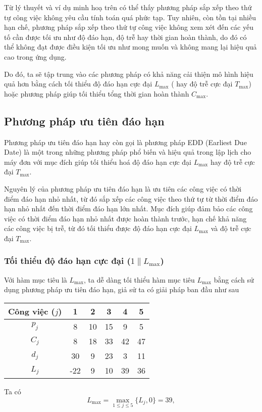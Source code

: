 \documentclass[12pt,a4paper]{report}
\begin{document}
Từ lý thuyết và ví dụ minh hoạ trên có thể thấy phương pháp sắp xếp theo thứ tự công việc không yêu cầu tính toán quá phức tạp. Tuy nhiên, còn tồn tại nhiều hạn chế, phương pháp sắp xếp theo thứ tự công việc không xem xét đến các yếu tố cần được tối ưu như độ đáo hạn, độ trễ hay thời gian hoàn thành, do đó có thể không đạt được điều kiện tối ưu như mong muốn và không mang lại hiệu quả cao trong ứng dụng.

Do đó, ta sẽ tập trung vào các phương pháp có khả năng cải thiện mô hình hiệu quả hơn bằng cách tối thiểu độ đáo hạn cực đại $L_{\max}$ ( hay độ trễ cực đại $T_{\max}$) hoặc phương pháp giúp tối thiểu tổng thời gian hoàn thành $C_{\max}$.
\subsection{Phương pháp ưu tiên đáo hạn}
Phương pháp ưu tiên đáo hạn hay còn gọi là phương pháp EDD (Earliest Due Date) là một trong những phương pháp phổ biến và hiệu quả trong lập lịch cho máy đơn với mục đích giúp tối thiểu hoá độ đáo hạn cực đại $L_{\max}$ hay độ trễ cực đại $T_{\max}$.

Nguyên lý của phương pháp ưu tiên đáo hạn là ưu tiên các công việc có thời điểm đáo hạn nhỏ nhất, từ đó sắp xếp các công việc theo thứ tự từ thời điểm đáo hạn nhỏ nhất đến thời điểm đáo hạn lớn nhất. Mục đích giúp đảm bảo các công việc có thời điểm đáo hạn nhỏ nhất được hoàn thành trước, hạn chế khả năng các công việc bị trễ, từ đó tối thiểu được độ đáo hạn cực đại $L_{\max}$ và độ trễ cực đại $T_{\max}$.

\subsubsection*{Tối thiểu độ đáo hạn cực đại ($1 \| L_{\max}$)}
Với hàm mục tiêu là $L_{\max}$, ta dễ dàng tối thiểu hàm mục tiêu $L_{\max}$ bằng cách sử dụng phương pháp ưu tiên đáo hạn, giả sử ta có giải pháp ban đầu như sau

\begin{table}[h!]
	\centering
	\begin{tabular}{|c | c c c c c |} 
	\hline
	Công việc ($j$) & 1 & 2 & 3 & 4 & 5 \\
	\hline\hline
	$p_j$ & 8 & 10 & 15 & 9 & 5 \\
	$C_j$ & 8 & 18 & 33 & 42 & 47 \\
	$d_j$ & 30 & 9 & 23 & 3 & 11 \\
	$L_j$ & -22 & 9 & 10 & 39 & 36 \\
	\hline
	\end{tabular}
\end{table}
Ta có
\begin{equation*}
	L_{\max} = \max _{1 \leq j \leq 5} \{L_j, 0\} = 39,
\end{equation*}
\end{document}
